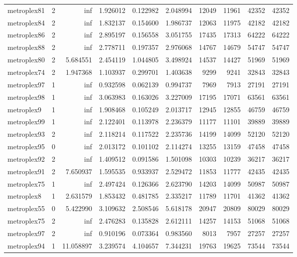 \begin{longtable}{|l|r|r|r|r|r|r|r|r|r|}
metroplex81 & 2 & inf & 1.926012 & 0.122982 & 2.048994 & 12049 & 11961 & 42352 & 42352 \\
metroplex84 & 2 & inf & 1.832137 & 0.154600 & 1.986737 & 12063 & 11975 & 42182 & 42182 \\
metroplex86 & 2 & inf & 2.895197 & 0.156558 & 3.051755 & 17435 & 17313 & 64222 & 64222 \\
metroplex88 & 2 & inf & 2.778711 & 0.197357 & 2.976068 & 14767 & 14679 & 54747 & 54747 \\
metroplex80 & 2 & 5.684551 & 2.454119 & 1.044805 & 3.498924 & 14537 & 14427 & 51969 & 51969 \\
metroplex74 & 2 & 1.947368 & 1.103937 & 0.299701 & 1.403638 & 9299 & 9241 & 32843 & 32843 \\
metroplex97 & 1 & inf & 0.932598 & 0.062139 & 0.994737 & 7969 & 7913 & 27191 & 27191 \\
metroplex98 & 1 & inf & 3.063983 & 0.163026 & 3.227009 & 17195 & 17071 & 63561 & 63561 \\
metroplex9 & 1 & inf & 1.908468 & 0.105249 & 2.013717 & 12945 & 12855 & 46759 & 46759 \\
metroplex99 & 1 & inf & 2.122401 & 0.113978 & 2.236379 & 11177 & 11101 & 39889 & 39889 \\
metroplex93 & 2 & inf & 2.118214 & 0.117522 & 2.235736 & 14199 & 14099 & 52120 & 52120 \\
metroplex95 & 0 & inf & 2.013172 & 0.101102 & 2.114274 & 13255 & 13159 & 47458 & 47458 \\
metroplex92 & 2 & inf & 1.409512 & 0.091586 & 1.501098 & 10303 & 10239 & 36217 & 36217 \\
metroplex91 & 2 & 7.650937 & 1.595535 & 0.933937 & 2.529472 & 11853 & 11777 & 42435 & 42435 \\
metroplex75 & 1 & inf & 2.497424 & 0.126366 & 2.623790 & 14203 & 14099 & 50987 & 50987 \\
metroplex8 & 1 & 2.631579 & 1.853432 & 0.481785 & 2.335217 & 11789 & 11701 & 41362 & 41362 \\
metroplex55 & 0 & 5.422990 & 3.109632 & 2.508546 & 5.618178 & 20947 & 20809 & 80029 & 80029 \\
metroplex75 & 2 & inf & 2.476283 & 0.135828 & 2.612111 & 14257 & 14153 & 51068 & 51068 \\
metroplex97 & 2 & inf & 0.910196 & 0.073364 & 0.983560 & 8013 & 7957 & 27257 & 27257 \\
metroplex94 & 1 & 11.058897 & 3.239574 & 4.104657 & 7.344231 & 19763 & 19625 & 73544 & 73544 \\

\end{longtable}
